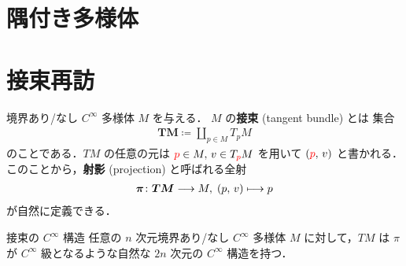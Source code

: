 \documentclass[geometry_main]{subfiles}
\begin{document}

\section{隅付き多様体}


\section{接束再訪}

境界あり/なし $C^\infty$ 多様体 $M$ を与える．
$M$ の\textbf{接束} (tangent bundle) とは
集合
\begin{align}
    \bm{TM} \coloneqq \coprod_{p \in M} T_p M
\end{align}
のことである．$TM$ の任意の元は $\textcolor{red}{p} \in M,\, v \in T_{\textcolor{red}{p}} M$ を用いて $(\textcolor{red}{p},\, v)$ と書かれる．
このことから，\textbf{射影} (projection) と呼ばれる全射
\begin{align}
    \bm{\pi} \colon \bm{TM} \longrightarrow M,\; (p,\, v) \longmapsto p
\end{align}
が自然に定義できる．

\begin{myprop}[label=prop:tangentbundle]{接束の $C^\infty$ 構造}
    任意の $n$ 次元境界あり/なし $C^\infty$ 多様体 $M$ に対して，$TM$ は $\pi$ が $C^\infty$ 級となるような自然な $2n$ 次元の $C^\infty$ 構造を持つ．
\end{myprop}
\end{document}
